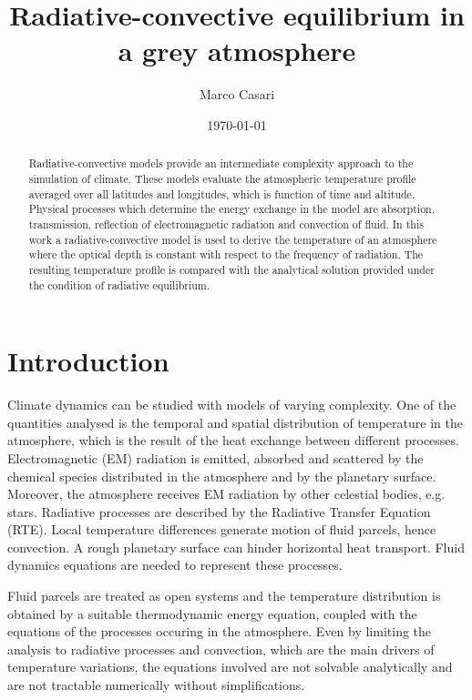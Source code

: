 \documentclass[a4paper,10pt,twocolumn,\classoptions]{article}
\begin{document}
\title{Radiative-convective equilibrium in a grey atmosphere}
\author{Marco Casari}
\date{\today}
\maketitle

\begin{abstract}
  Radiative-convective models provide an intermediate complexity approach to the simulation of climate. These models evaluate the atmospheric temperature profile averaged over all latitudes and longitudes, which is function of time and altitude.
  Physical processes which determine the energy exchange in the model are absorption, transmission, reflection of electromagnetic radiation and convection of fluid.
  In this work a radiative-convective model is used to derive the temperature of an atmosphere where the optical depth is constant with respect to the frequency of radiation. The resulting temperature profile is compared with the analytical solution provided under the condition of radiative equilibrium.
\end{abstract}


\section{Introduction}
\label{sec:Introduction}
Climate dynamics can be studied with models of varying complexity. One of the quantities analysed is the temporal and spatial distribution of temperature in the atmosphere, which is the result of the heat exchange between different processes. Electromagnetic (EM) radiation is emitted, absorbed and scattered by the chemical species distributed in the atmosphere and by the planetary surface. Moreover, the atmosphere receives EM radiation by other celestial bodies, e.g. stars. Radiative processes are described by the Radiative Transfer Equation (RTE).
Local temperature differences generate motion of fluid parcels, hence convection. A rough planetary surface can hinder horizontal heat transport. Fluid dynamics equations are needed to represent these processes.

Fluid parcels are treated as open systems and the temperature distribution is obtained by a suitable thermodynamic energy equation, coupled with the equations of the processes occuring in the atmosphere. Even by limiting the analysis to radiative processes and convection, which are the main drivers of temperature variations, the equations involved are not solvable analytically and are not tractable numerically without simplifications.
\end{document}
